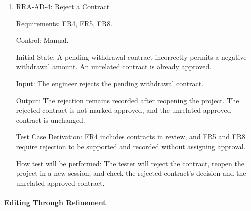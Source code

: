 \documentclass[12pt, titlepage]{article}
\begin{document}
\begin{enumerate}
Requirements: FR5, FR8, FR9, HA-SR1; PUC3.

Control: Manual.

Initial State: A report export proposal is pending. A separate report preview
requirement has already been approved.

Input: The engineer rejects the pending export proposal.

Output: The rejection remains recorded after reopening the project. The
rejected items do not appear as approved intent, and the previously approved
preview requirement remains unchanged.

Test Case Derivation: FR5 permits rejection and FR8 requires recording the
decision. FR9 distinguishes approved intent from a rejected proposal.

How test will be performed: The tester will reject the export proposal, reopen
the project in a new session, and inspect the recorded decision and approved
artifacts. Retention of the rejected draft as history is acceptable.

\item{RRA-AD-4: Reject a Contract\\}

Requirements: FR4, FR5, FR8.

Control: Manual.

Initial State: A pending withdrawal contract incorrectly permits a negative
withdrawal amount. An unrelated contract is already approved.

Input: The engineer rejects the pending withdrawal contract.

Output: The rejection remains recorded after reopening the project. The
rejected contract is not marked approved, and the unrelated approved contract
is unchanged.

Test Case Derivation: FR4 includes contracts in review, and FR5 and FR8
require rejection to be supported and recorded without assigning approval.

How test will be performed: The tester will reject the contract, reopen the
project in a new session, and check the rejected contract's decision and the
unrelated approved contract.

\end{enumerate}

\paragraph{Editing Through Refinement}
\end{document}
